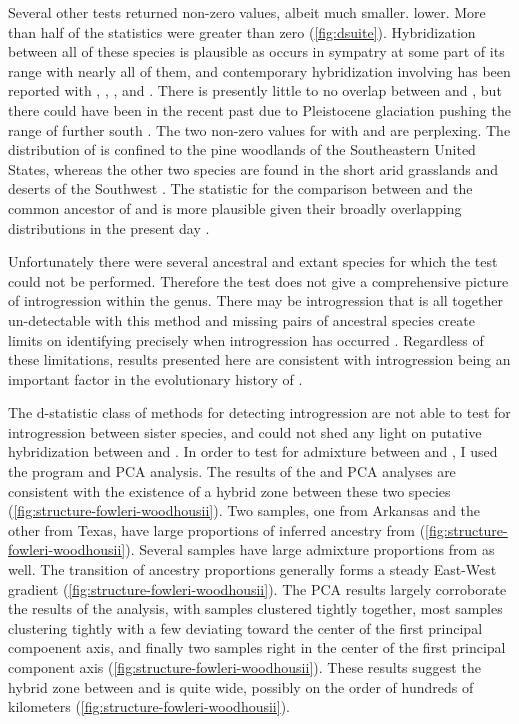 Several other \fbranch tests returned non-zero values, albeit much smaller.
lower.
More than half of the \wood \fbranch statistics were greater than zero (\cref{fig:dsuite}).
Hybridization between all of these species is plausible as \wood occurs in 
sympatry at some part of its range with nearly all of them, 
and contemporary hybridization involving \wood has been reported with \amer, 
\cognatus, \microscaphus, and \speciosus \parencite{sullivan1986}. 
There is presently little to no overlap between \wood and \hemiophrys, but
there could have been in the recent past due to Pleistocene glaciation  
pushing the range of \hemiophrys further south \parencite{henrich1968}. 
The two non-zero \fbranch values for \quercicus with \punctatus and \speciosus 
are perplexing.  
The distribution of \quercicus is confined to the pine woodlands of the 
Southeastern United States, whereas the other two species are found in the  
short arid grasslands and deserts of the Southwest \parencite{conant1998}. 
The \fbranch statistic for the comparison between \punctatus and the common 
ancestor of \speciosus and \cognatus is more plausible given their broadly
overlapping distributions in the present day \parencite{conant1998}.

Unfortunately there were several ancestral and extant \anaxyrus species 
for which the \fbranch test could not be performed. 
Therefore the \fbranch test does not give a comprehensive picture of introgression
within the genus. 
There may be introgression that is all together un-detectable with this method
and missing pairs of ancestral species create limits on identifying precisely
when introgression has occurred \parencite{malinsky2021}.
Regardless of these limitations, results presented here are consistent with 
introgression being an important factor in the evolutionary history of \anaxyrus.

The d-statistic class of methods for detecting introgression are not able to   
test for introgression between sister species, and could not shed any light 
on putative hybridization between \fowl and \wood \parencite{meacham1962}. 
In order to test for admixture between \fowl and \wood, I used the program 
\structure and PCA analysis.  
The results of the \structure and PCA analyses are consistent with the existence of  
a hybrid zone between these two species (\cref{fig:structure-fowleri-woodhousii}).
Two \wood samples, one from Arkansas and the other from Texas, have large proportions 
of inferred ancestry from \fowl (\cref{fig:structure-fowleri-woodhousii}). 
Several \fowl samples have large admixture proportions from \wood as well.  
The transition of ancestry proportions generally forms a steady East-West gradient 
(\cref{fig:structure-fowleri-woodhousii}).
The PCA results largely corroborate the results of the \structure analysis, with 
\wood samples clustered tightly together, most \fowl samples clustering tightly
with a few deviating toward the center of the first principal compoenent axis, 
and finally two samples right in the center of the first principal component axis
(\cref{fig:structure-fowleri-woodhousii}).
These results suggest the hybrid zone between \fowl and \wood is quite wide, 
possibly on the order of hundreds of kilometers (\cref{fig:structure-fowleri-woodhousii}).

